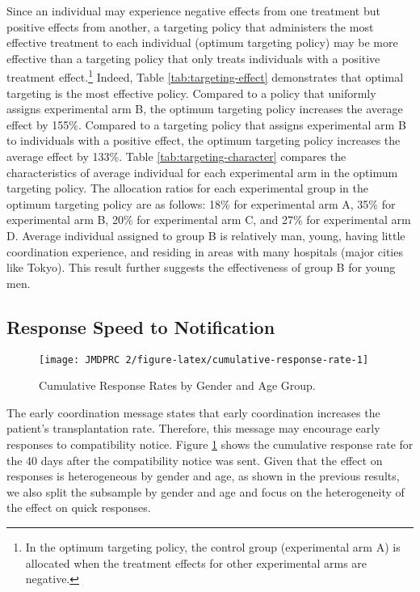 \documentclass[
  11pt,
  a4paper
]{article}
\begin{document}
Since an individual may experience negative effects from one treatment but positive effects from another, a targeting policy that administers the most effective treatment to each individual (optimum targeting policy) may be more effective than a targeting policy that only treats individuals with a positive treatment effect.\footnote{In the optimum targeting policy, the control group (experimental arm A) is allocated when the treatment effects for other experimental arms are negative.} Indeed, Table \ref{tab:targeting-effect} demonstrates that optimal targeting is the most effective policy. Compared to a policy that uniformly assigns experimental arm B, the optimum targeting policy increases the average effect by 155\%. Compared to a targeting policy that assigns experimental arm B to individuals with a positive effect, the optimum targeting policy increases the average effect by 133\%. Table \ref{tab:targeting-character} compares the characteristics of average individual for each experimental arm in the optimum targeting policy. The allocation ratios for each experimental group in the optimum targeting policy are as follows: 18\% for experimental arm A, 35\% for experimental arm B, 20\% for experimental arm C, and 27\% for experimental arm D. Average individual assigned to group B is relatively man, young, having little coordination experience, and residing in areas with many hospitals (major cities like Tokyo). This result further suggests the effectiveness of group B for young men.

\hypertarget{reply-speed}{%
\subsection{Response Speed to Notification}\label{reply-speed}}

\begin{figure}[t]
\texttt{[image: JMDPRC~2/figure-latex/cumulative-response-rate-1]} \caption{Cumulative Response Rates by Gender and Age Group.}\label{fig:cumulative-response-rate}
\end{figure}

The early coordination message states that early coordination increases the patient's transplantation rate. Therefore, this message may encourage early responses to compatibility notice. Figure \ref{fig:cumulative-response-rate} shows the cumulative response rate for the 40 days after the compatibility notice was sent. Given that the effect on responses is heterogeneous by gender and age, as shown in the previous results, we also split the subsample by gender and age and focus on the heterogeneity of the effect on quick responses.
\end{document}
